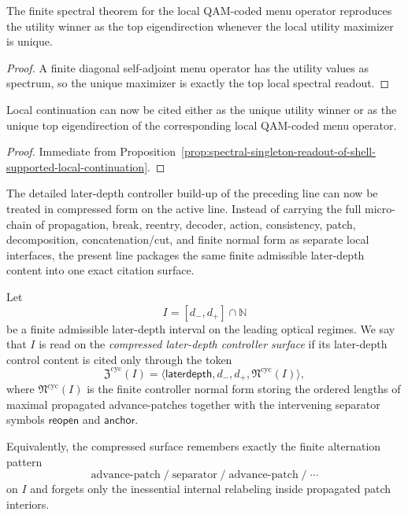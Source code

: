 \begin{proposition}
\label{prop:spectral-singleton-readout-of-shell-supported-local-continuation}
The finite spectral theorem for the local QAM-coded menu operator reproduces the utility winner as the top eigendirection whenever the local utility maximizer is unique.
\end{proposition}

\begin{proof}
A finite diagonal self-adjoint menu operator has the utility values as spectrum, so the unique maximizer is exactly the top local spectral readout.
\end{proof}

\begin{corollary}
\label{cor:what-the-first-local-spectralqam-bridge-already-buys}
Local continuation can now be cited either as the unique utility winner or as the unique top eigendirection of the corresponding local QAM-coded menu operator.
\end{corollary}

\begin{proof}
Immediate from Proposition~\ref{prop:spectral-singleton-readout-of-shell-supported-local-continuation}.
\end{proof}
\begin{remark}
\label{rem:status-of-the-compressed-laterdepth-controller-surface-in-v324}
The detailed later-depth controller build-up of the preceding line can now be treated in compressed form on the active line. Instead of carrying the full micro-chain of propagation, break, reentry, decoder, action, consistency, patch, decomposition, concatenation/cut, and finite normal form as separate local interfaces, the present line packages the same finite admissible later-depth content into one exact citation surface.
\end{remark}

\begin{definition}
\label{def:compressed-laterdepth-controller-surface-on-admissible-windows}
Let
\[
I=[d_-,d_+]\cap\mathbb N
\]
be a finite admissible later-depth interval on the leading optical regimes. We say that $I$ is read on the \emph{compressed later-depth controller surface} if its later-depth control content is cited only through the token
\[
\mathfrak Z^{\mathrm{cyc}}(I)
=
\langle \mathsf{laterdepth},d_-,d_+,\mathfrak N^{\mathrm{cyc}}(I)\rangle,
\]
where $\mathfrak N^{\mathrm{cyc}}(I)$ is the finite controller normal form storing the ordered lengths of maximal propagated advance-patches together with the intervening separator symbols $\mathsf{reopen}$ and $\mathsf{anchor}$.

Equivalently, the compressed surface remembers exactly the finite alternation pattern
\[
\text{advance-patch}\; /\; \text{separator}\; /\; \text{advance-patch}\; /\; \cdots
\]
on $I$ and forgets only the inessential internal relabeling inside propagated patch interiors.
\end{definition}

